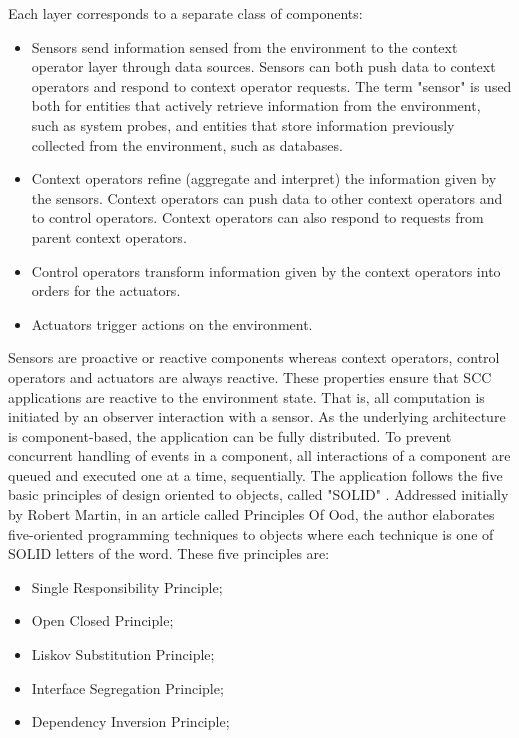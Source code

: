 \documentclass{acm_proc_article-sp}
\begin{document}
Each layer corresponds to a separate class of components: 
\begin{itemize}
\item Sensors send information sensed from the environment to the context operator layer through data sources. Sensors can both push data to context operators and respond to context operator requests. The term "sensor" is used both for entities that actively retrieve information from the environment, such as system probes, and entities that store information previously collected from the environment, such as databases.
\item Context operators refine (aggregate and interpret) the information given by the sensors. Context operators can push data to other context operators and to control operators. Context operators can also respond to requests from parent context operators. 
\item Control operators transform information given by the context operators into orders for the actuators. 
\item Actuators trigger actions on the environment.
\end{itemize}

Sensors are proactive or reactive components whereas context operators, control operators and actuators are always reactive. These properties ensure that SCC applications are reactive to the environment state. That is, all computation is initiated by an observer interaction with a sensor.
\newline
\newline
As the underlying architecture is component-based, the application can be fully distributed. To prevent concurrent handling of events in a component, all interactions of a component are queued and executed one at a time, sequentially.
\newline
\newline
The application follows the five basic principles of design oriented to objects, called "SOLID" \cite{DanielPace}. Addressed initially by Robert Martin, in an article called Principles Of Ood, the author elaborates five-oriented programming techniques to objects where each technique is one of SOLID letters of the word. These five principles are:
\begin{itemize}
\item Single Responsibility Principle;
\item Open Closed Principle;
\item Liskov Substitution Principle;
\item Interface Segregation Principle;
\item Dependency Inversion Principle;
\end{itemize} 
\end{document}
